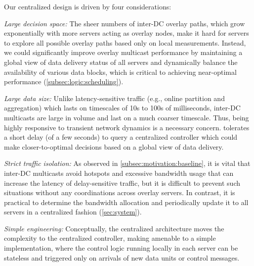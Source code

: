 Our centralized design is driven by four considerations:
\begin{packedenumerate}

\item {\em Large decision space:}
The sheer numbers of inter-DC overlay paths,
which grow exponentially with more servers acting as overlay nodes,
make it hard for servers to explore all possible overlay
paths based only on local measurements.
Instead, we could significantly improve overlay multicast
performance by maintaining a global view of data delivery
status of all servers and dynamically balance
the availability of
various data blocks, which
is critical to achieving near-optimal performance
(\Section\ref{subsec:logic:scheduling}).

\item {\em Large data size:}
Unlike latency-sensitive traffic
(e.g., online partition and aggregation) which lasts on timescales
of 10s to 100s of milliseconds, inter-DC multicasts are large in volume and
last on a much coarser timescale.
Thus, being highly responsive to transient network dynamics is a necessary concern. 
\name tolerates a short delay (of a few seconds) to query a centralized controller
which could make closer-to-optimal decisions based on a global view of data delivery.

\item {\em Strict traffic isolation:}
As observed in \Section\ref{subsec:motivation:baseline},
it is vital that inter-DC
multicasts avoid hotspots and excessive bandwidth usage that can increase the latency of delay-sensitive traffic,
but it is difficult to prevent such situations
without any coordinations across overlay servers.
In contrast, it is practical
to determine the bandwidth allocation and periodically update it
to all servers in a centralized fashion (\Section\ref{sec:system}).

\item {\em Simple engineering:}
Conceptually, the centralized architecture moves the complexity to
the centralized controller, making \name amenable to a simple implementation,
where the control logic running locally in each server can be stateless and
triggered only on arrivals of new data units or control messages.

\end{packedenumerate}

